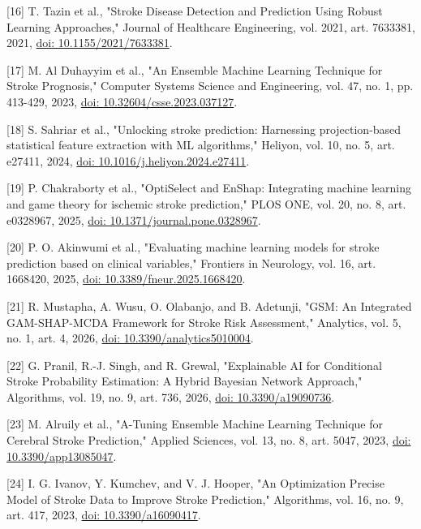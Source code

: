 \documentclass[10pt,twocolumn,letterpaper]{article}
\begin{document}
[16] T. Tazin et al., "Stroke Disease Detection and Prediction Using Robust Learning Approaches," Journal of Healthcare Engineering, vol. 2021, art. 7633381, 2021, \href{https://doi.org/10.1155/2021/7633381}{doi: 10.1155/2021/7633381}.


[17] M. Al Duhayyim et al., "An Ensemble Machine Learning Technique for Stroke Prognosis," Computer Systems Science and Engineering, vol. 47, no. 1, pp. 413-429, 2023, \href{https://doi.org/10.32604/csse.2023.037127}{doi: 10.32604/csse.2023.037127}.


[18] S. Sahriar et al., "Unlocking stroke prediction: Harnessing projection-based statistical feature extraction with ML algorithms," Heliyon, vol. 10, no. 5, art. e27411, 2024, \href{https://doi.org/10.1016/j.heliyon.2024.e27411}{doi: 10.1016/j.heliyon.2024.e27411}.


[19] P. Chakraborty et al., "OptiSelect and EnShap: Integrating machine learning and game theory for ischemic stroke prediction," PLOS ONE, vol. 20, no. 8, art. e0328967, 2025, \href{https://doi.org/10.1371/journal.pone.0328967}{doi: 10.1371/journal.pone.0328967}.


[20] P. O. Akinwumi et al., "Evaluating machine learning models for stroke prediction based on clinical variables," Frontiers in Neurology, vol. 16, art. 1668420, 2025, \href{https://doi.org/10.3389/fneur.2025.1668420}{doi: 10.3389/fneur.2025.1668420}.


[21] R. Mustapha, A. Wusu, O. Olabanjo, and B. Adetunji, "GSM: An Integrated GAM-SHAP-MCDA Framework for Stroke Risk Assessment," Analytics, vol. 5, no. 1, art. 4, 2026, \href{https://doi.org/10.3390/analytics5010004}{doi: 10.3390/analytics5010004}.


[22] G. Pranil, R.-J. Singh, and R. Grewal, "Explainable AI for Conditional Stroke Probability Estimation: A Hybrid Bayesian Network Approach," Algorithms, vol. 19, no. 9, art. 736, 2026, \href{https://doi.org/10.3390/a19090736}{doi: 10.3390/a19090736}.


[23] M. Alruily et al., "A-Tuning Ensemble Machine Learning Technique for Cerebral Stroke Prediction," Applied Sciences, vol. 13, no. 8, art. 5047, 2023, \href{https://doi.org/10.3390/app13085047}{doi: 10.3390/app13085047}.


[24] I. G. Ivanov, Y. Kumchev, and V. J. Hooper, "An Optimization Precise Model of Stroke Data to Improve Stroke Prediction," Algorithms, vol. 16, no. 9, art. 417, 2023, \href{https://doi.org/10.3390/a16090417}{doi: 10.3390/a16090417}.
\end{document}
